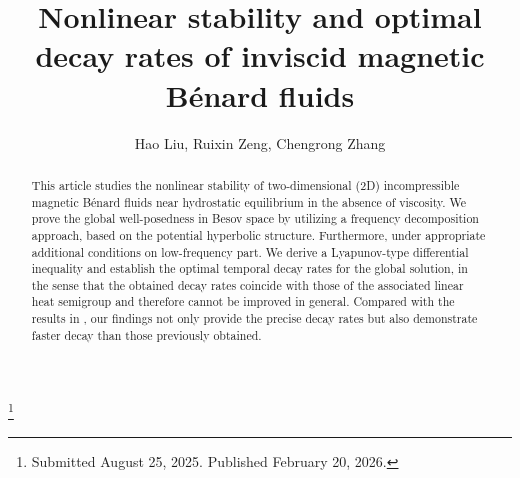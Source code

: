 \documentclass[reqno]{amsart}
\begin{document}
\title[\hfilneg EJDE-2025/17\hfil Inviscid  magnetic B\'enard fluids]
{Nonlinear stability and optimal decay rates of inviscid  magnetic B\'enard fluids}

\author[H. Liu, R. Zeng, C. Zhang \hfil EJDE-2025/17\hfilneg]
{Hao Liu, Ruixin Zeng, Chengrong Zhang}

\address{Hao Liu \newline
School of Mathematics and Statistics,
Fuzhou University, Fuzhou, 350108, China}

\address{Ruixin Zeng \newline
School of Mathematics and Statistics,
Fuzhou University, Fuzhou, 350108, China}

\address{Chengrong Zhang \newline
School of Mathematics and Statistics,
Fuzhou University, Fuzhou, 350108, China}

\thanks{Submitted August 25, 2025. Published February 20, 2026.}

\begin{abstract}
This article studies the nonlinear stability of two-dimensional (2D) incompressible 
magnetic B\'enard fluids near hydrostatic equilibrium in the absence of viscosity.
We prove the global well-posedness in Besov space by utilizing a frequency decomposition 
approach, based on the potential hyperbolic structure. Furthermore, under appropriate 
additional conditions on low-frequency part. 
We derive a Lyapunov-type differential inequality and establish the optimal temporal
decay rates for the global solution, in the sense that the obtained decay rates coincide 
with those of the associated linear heat semigroup and therefore cannot be improved in 
general. Compared with the results in \cite{MR4790886}, %
our findings not only provide the precise decay rates but also demonstrate faster 
decay than those previously obtained.
\end{abstract}

\maketitle
{}
\newtheorem{theorem}{Theorem}[section]
\newtheorem{lemma}[theorem]{Lemma}
\newtheorem{definition}[theorem]{Definition}
\newtheorem{remark}[theorem]{Remark}
\allowdisplaybreaks
\end{document}
